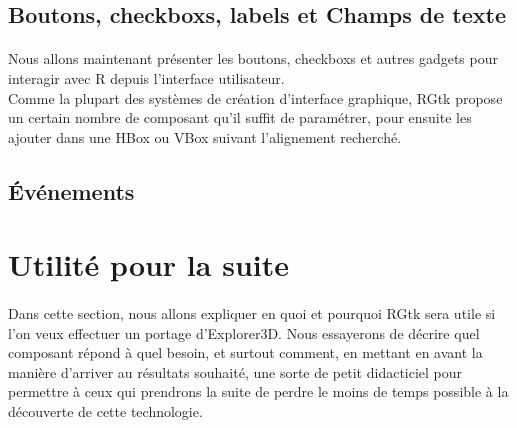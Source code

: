 \documentclass{article}
\begin{document}
\subsection{Boutons, checkboxs, labels et Champs de texte}
\paragraph{} 
Nous allons maintenant présenter les boutons, checkboxs et autres gadgets pour interagir avec R depuis l'interface utilisateur. \\
Comme la plupart des systèmes de création d'interface graphique, RGtk propose un certain nombre de composant qu'il suffit de paramétrer, pour ensuite les ajouter dans une HBox ou VBox suivant l'alignement recherché.

\subsection{Événements }


\section{Utilité pour la suite}
\paragraph{}
Dans cette section, nous allons expliquer en quoi et pourquoi RGtk sera utile si l'on veux effectuer un portage d'Explorer3D. Nous essayerons de décrire quel composant répond à quel besoin, et surtout comment, en mettant en avant la manière d'arriver au résultats souhaité, une sorte de petit didacticiel pour permettre à ceux qui prendrons la suite de perdre le moins de temps possible à la découverte de cette technologie.
\end{document}
